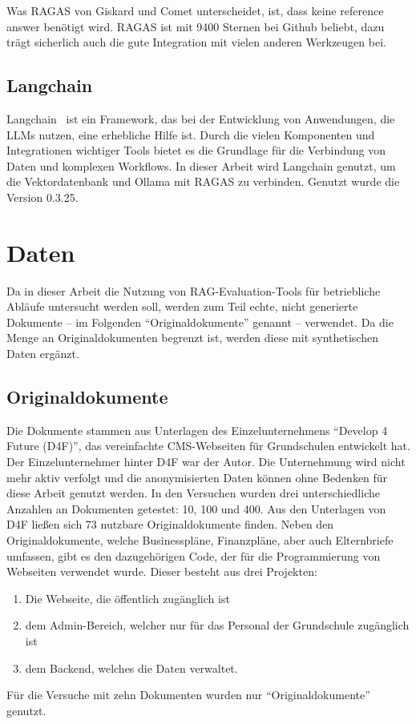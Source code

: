 Was RAGAS von Giskard und Comet unterscheidet, ist, dass keine \glqq reference answer\grqq{} benötigt wird.
RAGAS ist mit 9400 Sternen bei Github beliebt, dazu trägt sicherlich auch die gute Integration mit vielen anderen Werkzeugen bei.

\subsection{Langchain}
Langchain~\cite{langchain_framework} ist ein Framework, das bei der Entwicklung von Anwendungen, die LLMs nutzen, eine erhebliche Hilfe ist.
Durch die vielen Komponenten und Integrationen wichtiger Tools bietet es die Grundlage für die Verbindung von Daten und komplexen Workflows.
In dieser Arbeit wird Langchain genutzt, um die Vektordatenbank und Ollama mit RAGAS zu verbinden. Genutzt wurde die Version 0.3.25.

\section{Daten}
Da in dieser Arbeit die Nutzung von RAG-Evaluation-Tools für betriebliche Abläufe untersucht werden soll, werden zum Teil echte, nicht generierte Dokumente – im Folgenden \enquote{Originaldokumente} genannt – verwendet.
Da die Menge an Originaldokumenten begrenzt ist, werden diese mit synthetischen Daten ergänzt.

\subsection{Originaldokumente}
Die Dokumente stammen aus Unterlagen des Einzelunternehmens \enquote{Develop 4 Future (D4F)}, das vereinfachte CMS-Webseiten für Grundschulen entwickelt hat.
Der Einzelunternehmer hinter D4F war der Autor.
Die Unternehmung wird nicht mehr aktiv verfolgt und die anonymisierten Daten können ohne Bedenken für diese Arbeit genutzt werden.
In den Versuchen wurden drei unterschiedliche Anzahlen an Dokumenten getestet: 10, 100 und 400.
Aus den Unterlagen von D4F ließen sich 73 nutzbare Originaldokumente finden.
Neben den Originaldokumente, welche Businesspläne, Finanzpläne, aber auch Elternbriefe umfassen, gibt es den dazugehörigen Code, der für die Programmierung von Webseiten verwendet wurde.
Dieser besteht aus drei Projekten:
\begin{enumerate}
    \item Die Webseite, die öffentlich zugänglich ist
    \item dem Admin-Bereich, welcher nur für das Personal der Grundschule zugänglich ist
    \item dem Backend, welches die Daten verwaltet.
\end{enumerate}
Für die Versuche mit zehn Dokumenten wurden nur \enquote{Originaldokumente} genutzt.


